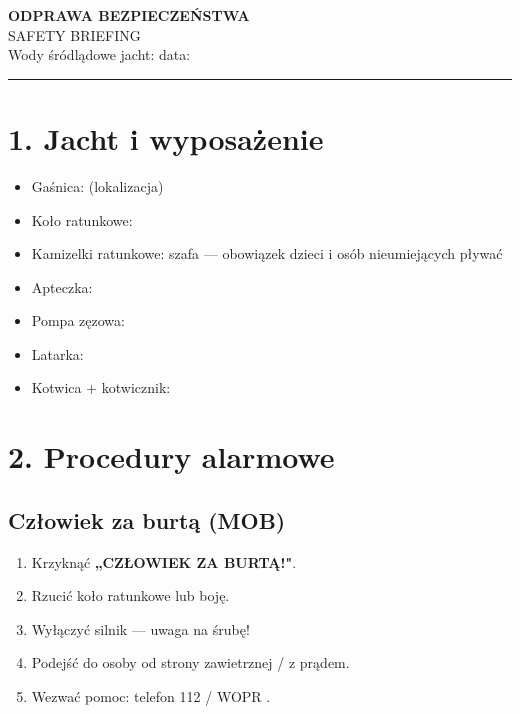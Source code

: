 \documentclass[a4paper,11pt]{article}
\begin{document}

\begin{center}
    {\Large\bfseries\color{pzzblue} ODPRAWA BEZPIECZEŃSTWA}\\
    {\large SAFETY BRIEFING}\\[4pt]
    {\normalsize Wody śródlądowe \textbullet{} jacht: \field{5cm} \textbullet{} data: \field{3cm}}
\end{center}

\vspace{0.3cm}
\noindent\rule{\linewidth}{1pt}

\section*{1. Jacht i wyposażenie}

\begin{itemize}[noitemsep]
    \item Gaśnica: \field{5cm} (lokalizacja)
    \item Koło ratunkowe: \field{4cm}
    \item Kamizelki ratunkowe: szafa \field{3cm} — obowiązek dzieci i osób nieumiejących pływać
    \item Apteczka: \field{4cm}
    \item Pompa zęzowa: \field{4cm}
    \item Latarka: \field{3cm}
    \item Kotwica + kotwicznik: \field{4cm}
\end{itemize}

\section*{2. Procedury alarmowe}

\subsection*{Człowiek za burtą (MOB)}
\begin{enumerate}[noitemsep]
    \item Krzyknąć \textbf{„CZŁOWIEK ZA BURTĄ!"}.
    \item Rzucić koło ratunkowe lub boję.
    \item Wyłączyć silnik — uwaga na śrubę!
    \item Podejść do osoby od strony zawietrznej / z prądem.
    \item Wezwać pomoc: telefon 112 / WOPR \field{5cm}.
\end{enumerate}
\end{document}
